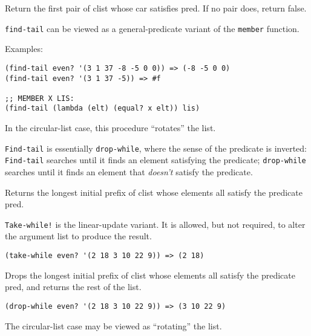 \begin{entry}{%
  }

  Return the first pair of clist whose car satisfies pred. If no pair
  does, return false.

  \texttt{find-tail} can be viewed as a general-predicate variant of
  the \texttt{member} function.

  Examples:

\begin{verbatim}
(find-tail even? '(3 1 37 -8 -5 0 0)) => (-8 -5 0 0)
(find-tail even? '(3 1 37 -5)) => #f

;; MEMBER X LIS:
(find-tail (lambda (elt) (equal? x elt)) lis)
\end{verbatim}

  In the circular-list case, this procedure ``rotates'' the list.

  \texttt{Find-tail} is essentially \texttt{drop-while}, where the
  sense of the predicate is inverted: \texttt{Find-tail} searches
  until it finds an element satisfying the predicate;
  \texttt{drop-while} searches until it finds an element that
  \emph{doesn't} satisfy the predicate.
\end{entry}

\begin{entry}{%
  }

  Returns the
  longest initial prefix of clist whose elements all satisfy the
  predicate pred.

  \texttt{Take-while!} is the linear-update variant. It is allowed,
  but not required, to alter the argument list to produce the result.

\begin{verbatim}
(take-while even? '(2 18 3 10 22 9)) => (2 18)
\end{verbatim}
\end{entry}

\begin{entry}{%
  }

  Drops the
  longest initial prefix of clist whose elements all satisfy the
  predicate pred, and returns the rest of the list.

\begin{verbatim}
(drop-while even? '(2 18 3 10 22 9)) => (3 10 22 9)
\end{verbatim}

  The circular-list case may be viewed as ``rotating'' the list.
\end{entry}

